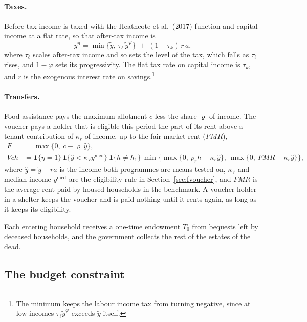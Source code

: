 \documentclass[10pt]{article}
\begin{document}
\paragraph{Taxes.} Before-tax income is taxed with the Heathcote et al.\ (2017) function
and capital income at a flat rate, so that after-tax income is
\begin{equation}\label{eq:ftax}
y^{n}=\min\big\{\tilde y,\ \tau_{\ell}\,\tilde y^{\varphi}\big\}\;+\;(1-\tau_k)\,r\,a ,
\end{equation}
where $\tau_{\ell}$ scales after-tax income and so sets the level of the tax, which falls as $\tau_{\ell}$ rises, and $1-\varphi$ sets
its progressivity. The flat tax rate on capital income is $\tau_k$, and $r$ is the exogenous interest rate on savings.\footnote{The minimum keeps the labour income tax from turning negative, since at low incomes $\tau_{\ell}\tilde y^{\varphi}$ exceeds $\tilde y$ itself.}

\paragraph{Transfers.} Food assistance pays the maximum allotment $\underline c$ less
the share $\varrho$ of income. The voucher pays a holder that is eligible this
period the part of its rent above a tenant contribution of $\kappa_r$ of income, up
to the fair market rent ($\mathit{FMR}$),
\begin{equation}\label{eq:ftrans}
\begin{aligned}
F&=\max\big\{0,\ \underline c-\varrho\,\hat y\big\},\\
V\!ch&=\mathbf{1}\{\eta=1\}\,\mathbf{1}\{\hat y<\kappa_V y^{\text{med}}\}\,\mathbf{1}\{h\neq h_1\}\,
\min\Big\{\max\{0,\ p_r h-\kappa_r\hat y\},\ \max\{0,\ \mathit{FMR}-\kappa_r\hat y\}\Big\},
\end{aligned}
\end{equation}
where $\hat y=\tilde y+ra$ is the income both programmes are means-tested on,
$\kappa_V$ and median income $y^{\text{med}}$ are the eligibility rule
in Section~\ref{sec:fvoucher}, and $\mathit{FMR}$ is the average rent paid by housed households in
the benchmark. A voucher
holder in a shelter keeps the voucher and is paid nothing until it rents again, as long as it keeps its eligibility.

Each
entering household receives a one-time endowment $T_0$ from bequests left by deceased households, and the
government collects the rest of the estates of the dead.

\subsection{The budget constraint}
\end{document}
